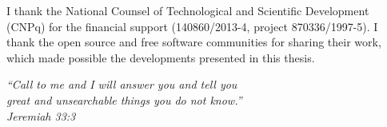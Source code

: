 \documentclass[
12pt,		%
openright,	%
twoside,  %
a4paper,			%
chapter=TITLE,		%
english,			%
french,				%
spanish,			%
brazil				%
]{USPSC}
\begin{document}
\begin{agradecimentos}
I thank the National Counsel of Technological and Scientific Development (CNPq)
for the financial support (140860/2013-4, project 870336/1997-5).
I thank the open source and free software communities for sharing their work,
which made possible the developments presented in this thesis.
% 
% 
% 
\end{agradecimentos}

\begin{epigrafe}
    \vspace*{\fill}
	\begin{flushright}
		\textit{``Call to me and I will answer you and tell you\\
		great and unsearchable things you do not know.''\\
		Jeremiah 33:3}
	\end{flushright}
\end{epigrafe}
\end{document}
